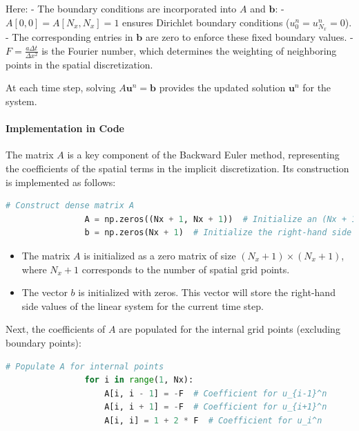 \documentclass{article}
\begin{document}
			Here:
			- The boundary conditions are incorporated into \( A \) and \( \mathbf{b} \):
			- \( A[0, 0] = A[N_x, N_x] = 1 \) ensures Dirichlet boundary conditions (\( u_0^n = u_{N_x}^n = 0 \)).
			- The corresponding entries in \( \mathbf{b} \) are zero to enforce these fixed boundary values.
			- \( F = \frac{a \Delta t}{\Delta x^2} \) is the Fourier number, which determines the weighting of neighboring points in the spatial discretization.
			
			At each time step, solving \( A \mathbf{u}^n = \mathbf{b} \) provides the updated solution \( \mathbf{u}^n \) for the system.
			
			
			\paragraph{Implementation in Code}
			
			The matrix \( A \) is a key component of the Backward Euler method, representing the coefficients of the spatial terms in the implicit discretization. Its construction is implemented as follows:
			
			\begin{lstlisting}[language=Python]
				# Construct dense matrix A
				A = np.zeros((Nx + 1, Nx + 1))  # Initialize an (Nx + 1) x (Nx + 1) matrix with zeros
				b = np.zeros(Nx + 1)  # Initialize the right-hand side vector
			\end{lstlisting}
			
			\begin{itemize}
				\item The matrix \( A \) is initialized as a zero matrix of size \( (N_x + 1) \times (N_x + 1) \), where \( N_x + 1 \) corresponds to the number of spatial grid points.
				\item The vector \( b \) is initialized with zeros. This vector will store the right-hand side values of the linear system for the current time step.
			\end{itemize}
			
			Next, the coefficients of \( A \) are populated for the internal grid points (excluding boundary points):
			
			\begin{lstlisting}[language=Python]
				# Populate A for internal points
				for i in range(1, Nx):
					A[i, i - 1] = -F  # Coefficient for u_{i-1}^n
					A[i, i + 1] = -F  # Coefficient for u_{i+1}^n
					A[i, i] = 1 + 2 * F  # Coefficient for u_i^n
			\end{lstlisting}
			
\end{document}

